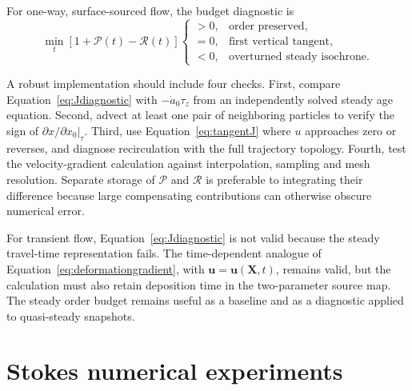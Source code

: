 \documentclass[review]{igs}
\begin{document}
For one-way, surface-sourced flow, the budget diagnostic is
\begin{equation}
\min_t\left[1+\mathcal{P}(t)-\mathcal{R}(t)\right]
\begin{cases}
>0, & \text{order preserved},\\
=0, & \text{first vertical tangent},\\
<0, & \text{overturned steady isochrone}.
\end{cases}
\label{eq:numericaltest}
\end{equation}

A robust implementation should include four checks. First, compare Equation~\ref{eq:Jdiagnostic} with \(-\dot a_0\tau_z\) from an independently solved steady age equation. Second, advect at least one pair of neighboring particles to verify the sign of \(\partial x/\partial x_0|_{\tau}\). Third, use Equation~\ref{eq:tangentJ} where \(u\) approaches zero or reverses, and diagnose recirculation with the full trajectory topology. Fourth, test the velocity-gradient calculation against interpolation, sampling and mesh resolution. Separate storage of \(\mathcal{P}\) and \(\mathcal{R}\) is preferable to integrating their difference because large compensating contributions can otherwise obscure numerical error.

For transient flow, Equation~\ref{eq:Jdiagnostic} is not valid because the steady travel-time representation fails. The time-dependent analogue of Equation~\ref{eq:deformationgradient}, with \(\bm{u}=\bm{u}(\bm{X},t)\), remains valid, but the calculation must also retain deposition time in the two-parameter source map. The steady order budget remains useful as a baseline and as a diagnostic applied to quasi-steady snapshots.

\section{Stokes numerical experiments}
\end{document}
